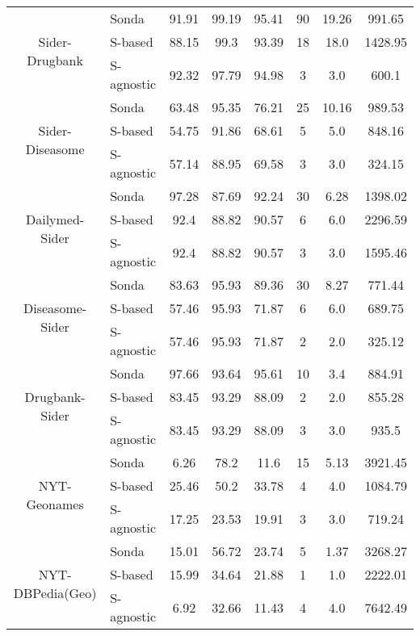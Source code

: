 \begin{table}
\begin{tabular}{|c|l|c|c|c|c|c|c|}
\multirow{3}{*}{Sider-Drugbank} & Sonda &  91.91 & 99.19 & 95.41  & 90 & 19.26   & 991.65     \\
											& S-based  & 88.15 & 99.3 & 93.39  & 18 & 18.0   & 1428.95\\
 											& S-agnostic     & 92.32 & 97.79 & 94.98  & 3 & 3.0   & 600.1     \\ \hline 											

\multirow{3}{*}{Sider-Diseasome} & Sonda    & 63.48 & 95.35 & 76.21  & 25 & 10.16   & 989.53  \\
											& S-based   & 54.75 & 91.86 & 68.61  & 5 & 5.0   & 848.16\\
 											& S-agnostic    & 57.14 & 88.95 & 69.58  & 3 & 3.0   & 324.15      \\ \hline 		 									

\multirow{3}{*}{Dailymed-Sider} & Sonda     & 97.28 & 87.69 & 92.24  & 30 & 6.28   & 1398.02 \\
											& S-based  & 92.4 & 88.82 & 90.57  & 6 & 6.0   & 2296.59\\
 											& S-agnostic         & 92.4 & 88.82 & 90.57  & 3 & 3.0   & 1595.46 \\ \hline 		

\multirow{3}{*}{Diseasome-Sider} & Sonda    & 83.63 & 95.93 & 89.36  & 30 & 8.27   & 771.44   \\
											& S-based   & 57.46 & 95.93 & 71.87  & 6 & 6.0   & 689.75\\
 											& S-agnostic  & 57.46 & 95.93 & 71.87  & 2 & 2.0   & 325.12        \\ \hline 		 									

\multirow{3}{*}{Drugbank-Sider} & Sonda    & 97.66 & 93.64 & 95.61  & 10 & 3.4   & 884.91   \\
											& S-based   & 83.45 & 93.29 & 88.09  & 2 & 2.0   & 855.28\\
 											& S-agnostic          & 83.45 & 93.29 & 88.09  & 3 & 3.0   & 935.5\\ \hline 											


\multirow{3}{*}{NYT-Geonames} & Sonda & 6.26 & 78.2 & 11.6  & 15 & 5.13   & 3921.45  \\
											& S-based   & 25.46 & 50.2 & 33.78  & 4 & 4.0   & 1084.79 \\
 											& S-agnostic    & 17.25 & 23.53 & 19.91  & 3 & 3.0   & 719.24 \\ \hline 											


\multirow{3}{*}{NYT-DBPedia(Geo)} & Sonda & 15.01 & 56.72 & 23.74  & 5 & 1.37   & 3268.27   \\
											& S-based   & 15.99 & 34.64 & 21.88  & 1 & 1.0   & 2222.01\\
 											& S-agnostic & 6.92 & 32.66 & 11.43  & 4 & 4.0   & 7642.49      \\ \hline 											
 		

\end{tabular}
\end{table}
